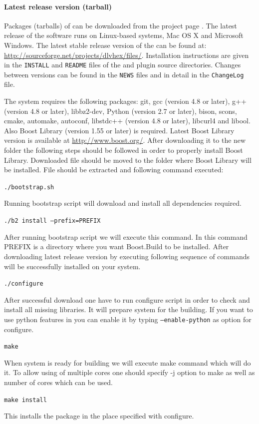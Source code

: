 \documentclass[14pt,a4paper, titlepage]{article}
\begin{document}
\paragraph{Latest release version (tarball)}
Packages (tarballs) of \dlvhex{} can be downloaded from the project page \cite{sourceforge}. The latest release of the software runs on Linux-based systems, Mac OS X and Microsoft Windows. The latest stable release version of the \dlvhex{} can be found at: \url{http://sourceforge.net/projects/dlvhex/files/}. Installation instructions are given in the {\tt INSTALL} and {\tt README} files of the \dlvhex{} and plugin source directories. Changes between versions can be found in the {\tt NEWS} files and in detail in the {\tt ChangeLog} file. 

The system requires the following packages: git, gcc (version 4.8 or later), g++ (version 4.8 or later), libbz2-dev, Python (version 2.7 or later), bison, scons, cmake, automake, autoconf, libstdc++ (version 4.8 or later), libcurl4 and libool. Also Boost Library (version 1.55 or later) is required. Latest Boost Library version is available at \url{http://www.boost.org/}. After downloading it to the new folder the following steps should be followed in order to properly install Boost Library. Downloaded file should be moved to the folder where Boost Library will be installed. File should be extracted and following command executed:
\\ \centerline{\texttt{./bootstrap.sh}}
Running bootstrap script will download and install all dependencies required.
\centerline{\texttt{./b2 install --prefix=PREFIX}} After running bootstrap script we will execute this command. In this command PREFIX is a directory where you want Boost.Build to be installed. After downloading latest release version by executing following sequence of commands \dlvhex{} will be successfully installed on your system.
\\ \centerline{\texttt{./configure}} After successful download one have to run configure script in order to check and install all missing libraries. It will prepare system for the building. If you want to use python features in \dlvhex you can enable it by typing \texttt{--enable-python} as option for configure.
\\ \centerline{\texttt{make}} When system is ready for building we will execute make command which will do it. To allow using of multiple cores one should specify -j option to make as well as number of cores which can be used.
\\ \centerline{\texttt{make install}} This installs the package in the place specified with configure.  
   
\end{document}
